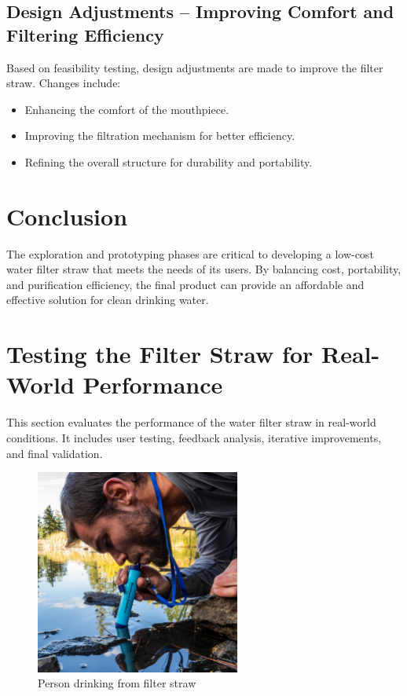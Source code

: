 \documentclass{article}
\begin{document}
\subsection{Design Adjustments – Improving Comfort and Filtering Efficiency}
Based on feasibility testing, design adjustments are made to improve the filter straw. Changes include:
\begin{itemize}
    \item Enhancing the comfort of the mouthpiece.
    \item Improving the filtration mechanism for better efficiency.
    \item Refining the overall structure for durability and portability.
\end{itemize}

\vspace{0.5cm}

\section*{Conclusion}
The exploration and prototyping phases are critical to developing a low-cost water filter straw that meets the needs of its users. By balancing cost, portability, and purification efficiency, the final product can provide an affordable and effective solution for clean drinking water.

\newpage






\section{Testing the Filter Straw for Real-World Performance}
This section evaluates the performance of the water filter straw in real-world conditions. It includes user testing, feedback analysis, iterative improvements, and final validation.

\vspace{0.5cm}

\begin{figure}[h!]
    \centering
    \includegraphics[width=0.6\textwidth]{test.jpg}
    \caption{Person drinking from filter straw}
    \label{fig:Drinking_water}
\end{figure}
\end{document}

